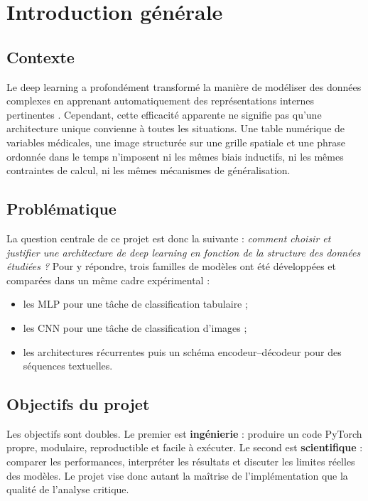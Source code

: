 \chapter{Introduction générale}

\section{Contexte}
Le deep learning a profondément transformé la manière de modéliser des données complexes en apprenant automatiquement des représentations internes pertinentes \citep{goodfellow2016deep}. Cependant, cette efficacité apparente ne signifie pas qu’une architecture unique convienne à toutes les situations. Une table numérique de variables médicales, une image structurée sur une grille spatiale et une phrase ordonnée dans le temps n’imposent ni les mêmes biais inductifs, ni les mêmes contraintes de calcul, ni les mêmes mécanismes de généralisation.

\section{Problématique}
La question centrale de ce projet est donc la suivante : \emph{comment choisir et justifier une architecture de deep learning en fonction de la structure des données étudiées ?} Pour y répondre, trois familles de modèles ont été développées et comparées dans un même cadre expérimental :
\begin{itemize}[leftmargin=1.2cm]
    \item les MLP pour une tâche de classification tabulaire ;
    \item les CNN pour une tâche de classification d’images ;
    \item les architectures récurrentes puis un schéma encodeur--décodeur pour des séquences textuelles.
\end{itemize}

\section{Objectifs du projet}
Les objectifs sont doubles. Le premier est \textbf{ingénierie} : produire un code PyTorch propre, modulaire, reproductible et facile à exécuter. Le second est \textbf{scientifique} : comparer les performances, interpréter les résultats et discuter les limites réelles des modèles. Le projet vise donc autant la maîtrise de l’implémentation que la qualité de l’analyse critique.


